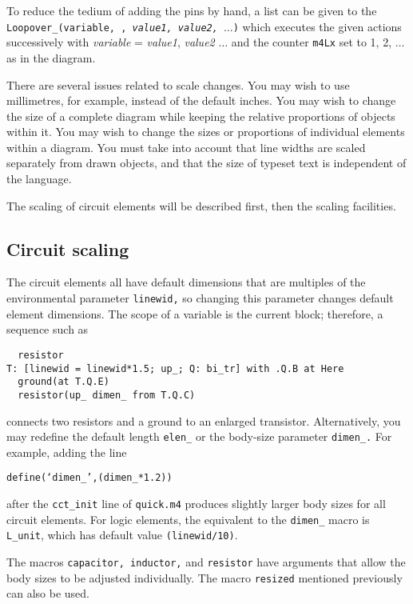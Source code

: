 To reduce the tedium of adding the pins by hand, a list
can be given to the
{\tt Loopover\_(variable,
,
{\sl value1, value2, $\ldots$})}
which executes the given actions successively with
 {\sl variable} = {\sl value1}, {\sl value2} $\ldots$ and the
 counter {\tt m4Lx} set to 1, 2, $\ldots$ as in the diagram.


There are several issues related to scale changes.  You may wish to use
millimetres, for example, instead of the default inches.  You may wish
to change the size of a complete diagram while keeping the relative
proportions of objects within it.  You may wish to change the sizes or
proportions of individual elements within a diagram.  You must take
into account that line widths are scaled separately from drawn objects,
and that the size of typeset text is independent of the \pic language.

The scaling of circuit elements will be described first, then
the \pic scaling facilities.

\subsection{Circuit scaling\label{Circuitscaling:}}
The circuit elements all have default dimensions
that are multiples of the \pic environmental parameter {\tt linewid,}
so changing this parameter changes default element dimensions.
The scope of a \pic variable is the current block; therefore, a sequence
such as

\begin{verbatim}
  resistor
T: [linewid = linewid*1.5; up_; Q: bi_tr] with .Q.B at Here
  ground(at T.Q.E)
  resistor(up_ dimen_ from T.Q.C)
\end{verbatim}

\noindent%
connects two resistors and a ground to an enlarged transistor.
Alternatively, you may redefine the default length {\tt elen\_}
or the body-size parameter {\tt dimen\_.}  For example, adding the line

{\tt define(`dimen\_',(dimen\_*1.2))}

\noindent%
after the {\tt cct\_init} line of {\tt quick.m4} produces slightly
larger body sizes for all circuit elements.  For logic elements, the
equivalent to the {\tt dimen\_} macro is {\tt L\_unit}, which has
default value {\tt (linewid/10)}.

The macros {\tt capacitor, inductor,} and {\tt resistor} have arguments
that allow the body sizes to be adjusted individually.  The macro
{\tt resized} mentioned previously can also be used.

